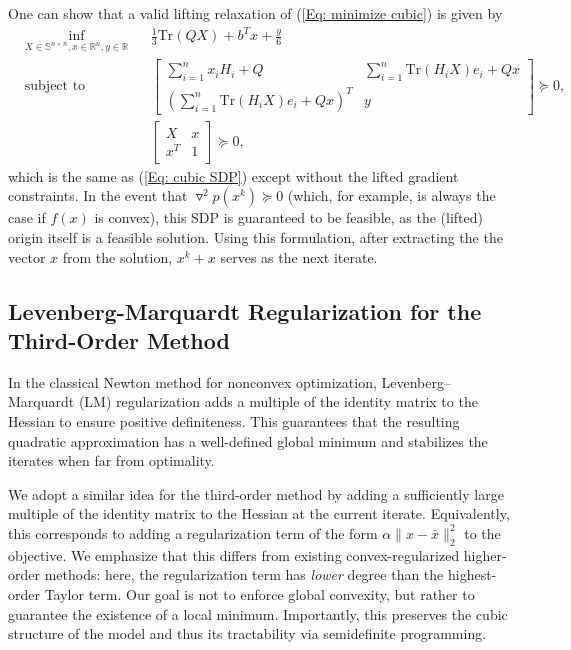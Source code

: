 \documentclass[11pt]{article}
\theoremstyle{plain}
\theoremstyle{definition}
\theoremstyle{remark}
\def \Snn{ \mathbb{S}^{n \times n}}
\def \bmat{\left[\begin{matrix}}
\def \emat{\end{matrix}\right]}
\def \Tr{\mathrm{Tr}}
\def \xbar{\bar{x}}
\def \Hess{\triangledown^2}
\def \R{\mathbb{R}}
\def \Rn{\R^n}
\begin{document}
One can show that a valid lifting relaxation of (\ref{Eq: minimize cubic}) is given by
\begin{equation}\label{Eq: no gradient cubic SDP}
    \begin{aligned}
	& \underset{X \in \Snn, x \in \Rn, y \in \R}{\inf}
	& & \frac{1}{3}\Tr(QX) + b^Tx + \frac{y}{6}\\
	& \text{subject to}
	&& \bmat \sum_{i=1}^n x_iH_i + Q & \sum_{i=1}^n \Tr(H_iX)e_i+Qx \\ (\sum_{i=1}^n \Tr(H_iX)e_i+Qx)^T & y\emat \succeq 0,\\
	&&& \bmat X & x \\ x^T & 1 \emat \succeq 0,
    \end{aligned}
\end{equation}
which is the same as (\ref{Eq: cubic SDP}) except without the lifted gradient constraints. In the event that $\Hess p(x^k) \succeq 0$ (which, for example, is always the case if $f(x)$ is convex), this SDP is guaranteed to be feasible, as the (lifted) origin itself is a feasible solution. Using this formulation, after extracting the the vector $x$ from the solution, $x^k + x$ serves as the next iterate.




\subsection{Levenberg-Marquardt Regularization for the Third-Order Method}\label{SSec: LM Regularization}

In the classical Newton method for nonconvex optimization, Levenberg–Marquardt (LM) regularization adds a multiple of the identity matrix to the Hessian to ensure positive definiteness. This guarantees that the resulting quadratic approximation has a well-defined global minimum and stabilizes the iterates when far from optimality.

We adopt a similar idea for the third-order method by adding a sufficiently large multiple of the identity matrix to the Hessian at the current iterate. Equivalently, this corresponds to adding a regularization term of the form $\alpha \|x - \xbar\|_2^2$ to the objective. We emphasize that this differs from existing convex-regularized higher-order methods: here, the regularization term has \emph{lower} degree than the highest-order Taylor term. Our goal is not to enforce global convexity, but rather to guarantee the existence of a local minimum. Importantly, this preserves the cubic structure of the model and thus its tractability via semidefinite programming.
\end{document}

